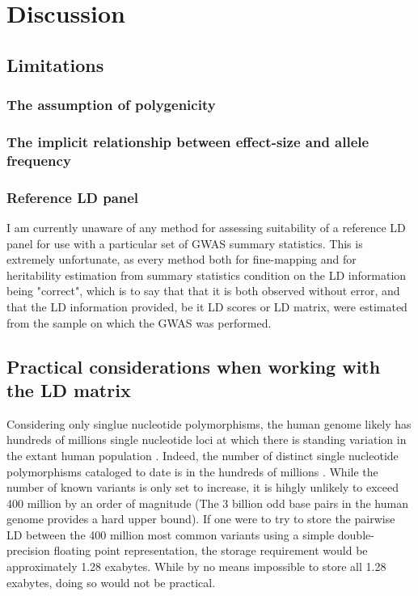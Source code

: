 {\section{Discussion}\label{sec:orge95691e}

\subsection{Limitations}\label{sec:org2dc1c0d}

\subsubsection{The assumption of polygenicity}\label{sec:orgefbe2e8}

\subsubsection{The implicit relationship between effect-size and allele frequency}\label{sec:org3cb4dd7}

\subsubsection{Reference LD panel}\label{sec:org73e10c3}

I am currently unaware of any method for assessing suitability of a reference LD panel for use with a particular set of GWAS summary statistics.  This is extremely unfortunate, as every 
method both for fine-mapping and for heritability estimation from summary statistics condition on the LD information being "correct", which is to say that that it is both observed without error, and that the LD information provided,
be it LD scores or LD matrix, were estimated from the sample on which the GWAS was performed.  


\subsection{Practical considerations when working with the LD matrix}\label{sec:org5745037}

Considering only singlue nucleotide polymorphisms, the human genome likely has hundreds of millions single nucleotide loci at which there is standing variation in the extant human population \cite{humgenref}.  Indeed, the number of distinct single nucleotide
polymorphisms cataloged to date is in the hundreds of millions \cite{humgenref}.  While the number of known variants is only set to increase, it is hihgly unlikely to exceed 400 million by an order of magnitude (The 3 billion odd base pairs in the human genome provides
a hard upper bound).  If one were to try to store the pairwise LD between the 400 million most common variants using a simple double-precision floating point representation, the storage requirement would be approximately 1.28 exabytes.  While by no means impossible to store
all 1.28 exabytes, doing so would not be practical.  

}
